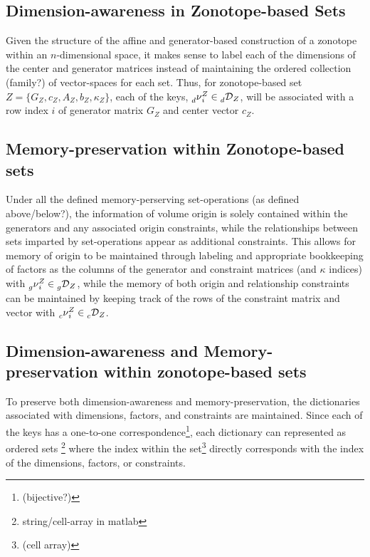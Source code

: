 \documentclass[11pt]{article}
\newcommand{\Key}{\nu} %
\newcommand{\Dict}{\mathcal{D}} %
\newcommand{\dimKey}{\prescript{}{d}{\Key}} %
\newcommand{\dimDict}{\prescript{}{d}{\Dict}} %
\newcommand{\factorKey}{\prescript{}{g}{\Key}} %
\newcommand{\factorDict}{\prescript{}{g}{\Dict}} %
\newcommand{\conKey}{\prescript{}{c}{\Key}} %
\newcommand{\conDict}{\prescript{}{c}{\Dict}} %
\newcommand{\dSet}{\kappa} %
\begin{document}
\subsection{Dimension-awareness in Zonotope-based Sets}
Given the structure of the affine and generator-based construction of a zonotope within an $n$-dimensional space, it makes sense to label each of the dimensions of the center and generator matrices instead of maintaining the ordered collection (family?) of vector-spaces for each set.
Thus, for zonotope-based set $Z = \{G_{Z},c_{Z},A_{Z},b_{Z},\dSet_{Z}\}$, each of the keys, $\dimKey^{Z}_{i} \in \dimDict_{Z}$, will be associated with a row index $i$ of generator matrix $G_{Z}$ and center vector $c_{Z}$.

\subsection{Memory-preservation within Zonotope-based sets}
Under all the defined memory-perserving set-operations (as defined above/below?), the information of volume origin is solely contained within the generators and any associated origin constraints, while the relationships between sets imparted by set-operations appear as additional constraints.
This allows for memory of origin to be maintained through labeling and appropriate bookkeeping of factors as the columns of the generator and constraint matrices (and $\dSet$ indices) with $\factorKey^{Z}_{i} \in \factorDict_{Z}$, while the memory of both origin and relationship constraints can be maintained by keeping track of the rows of the constraint matrix and vector with $\conKey^{Z}_{i} \in \conDict_{Z}$.

\subsection{Dimension-awareness and Memory-preservation within zonotope-based sets}

To preserve both dimension-awareness and memory-preservation, the dictionaries associated with dimensions, factors, and constraints are maintained.
Since each of the keys has a one-to-one correspondence\footnote{(bijective?)}, each dictionary can represented as ordered sets \footnote{string/cell-array in matlab} where the index within the set\footnote{(cell array)} directly corresponds with the index of the dimensions, factors, or constraints.
\end{document}
